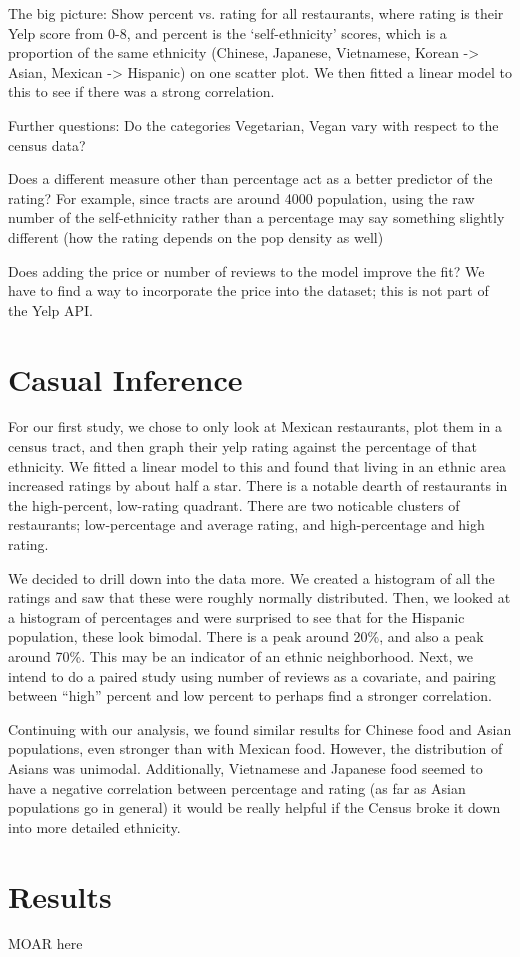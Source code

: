 \documentclass[11pt,twocolumn]{article}
\begin{document}
The big picture: Show percent vs. rating for all restaurants, where rating is their Yelp score from 0-8, and percent is the ‘self-ethnicity’ scores, which is a proportion of the same ethnicity (Chinese, Japanese, Vietnamese, Korean -> Asian, Mexican -> Hispanic) on one scatter plot. We then fitted a linear model to this to see if there was a strong correlation.

Further questions:
Do the categories Vegetarian, Vegan vary with respect to the census data?

Does a different measure other than percentage act as a better predictor of the rating? For example, since tracts are around 4000 population, using the raw number of the self-ethnicity rather than a percentage may say something slightly different (how the rating depends on the pop density as well)

Does adding the price or number of reviews to the model improve the fit? We have to find a way to incorporate the price into the dataset; this is not part of the Yelp API.

\section{Casual Inference}

For our first study, we chose to only look at Mexican restaurants, plot them in a census tract, and then graph their yelp rating against the percentage of that ethnicity. We fitted a linear model to this and found that living in an ethnic area increased ratings by about half a star. There is a notable dearth of restaurants in the high-percent, low-rating quadrant. There are two noticable clusters of restaurants; low-percentage and average rating, and high-percentage and high rating.

We decided to drill down into the data more. We created a histogram of all the ratings and saw that these were roughly normally distributed. Then, we looked at a histogram of percentages and were surprised to see that for the Hispanic population, these look bimodal. There is a peak around 20\%, and also a peak around 70\%. This may be an indicator of an ethnic neighborhood. Next, we intend to do a paired study using number of reviews as a covariate, and pairing between “high” percent and low percent to perhaps find a stronger correlation.

Continuing with our analysis, we found similar results for Chinese food and Asian populations, even stronger than with Mexican food. However, the distribution of Asians was unimodal. Additionally, Vietnamese and Japanese food seemed to have a negative correlation between percentage and rating (as far as Asian populations go in general) it would be really helpful if the Census broke it down into more detailed ethnicity.

\section{Results}

MOAR here
\end{document}
